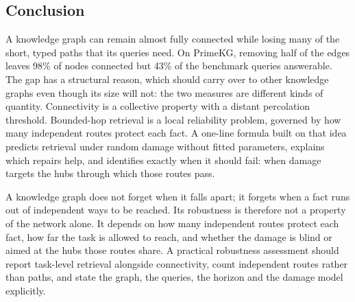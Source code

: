 \subsection{Conclusion}
A knowledge graph can remain almost fully connected while losing many of the
short, typed paths that its queries need. On PrimeKG, removing half of the edges
leaves 98\% of nodes connected but 43\% of the benchmark queries answerable. The gap
has a structural reason, which should carry over to other knowledge graphs even
though its size will not: the two measures are different kinds of quantity. Connectivity is a collective property with a distant percolation
threshold. Bounded-hop retrieval is a local reliability problem, governed by
how many independent routes protect each fact. A one-line formula built on that
idea predicts retrieval under random damage without fitted parameters, explains
which repairs help, and identifies exactly when it should fail: when damage
targets the hubs through which those routes pass.

A knowledge graph does not forget when it falls apart; it forgets when a fact
runs out of independent ways to be reached. Its robustness is therefore not a
property of the network alone. It depends on how many independent routes
protect each fact, how far the task is allowed to reach, and whether the damage
is blind or aimed at the hubs those routes share. A practical robustness
assessment should report task-level retrieval alongside connectivity, count
independent routes rather than paths, and state the graph, the queries, the
horizon and the damage model explicitly.
